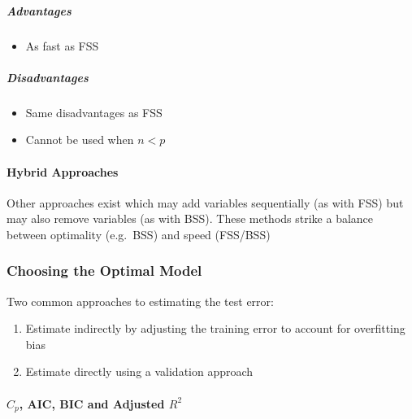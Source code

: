\documentclass[11pt]{article}
\providecommand{\tightlist}{%
      \setlength{\itemsep}{0pt}\setlength{\parskip}{0pt}}
\begin{document}
    \hypertarget{advantages}{%
\subparagraph{Advantages}\label{advantages}}

    \begin{itemize}
\tightlist
\item
  As fast as FSS
\end{itemize}

    \hypertarget{disadvantages}{%
\subparagraph{Disadvantages}\label{disadvantages}}

    \begin{itemize}
\tightlist
\item
  Same disadvantages as FSS
\item
  Cannot be used when \(n < p\)
\end{itemize}

    \hypertarget{hybrid-approaches}{%
\paragraph{Hybrid Approaches}\label{hybrid-approaches}}

    Other approaches exist which may add variables sequentially (as with
FSS) but may also remove variables (as with BSS). These methods strike a
balance between optimality (e.g.~BSS) and speed (FSS/BSS)

    \hypertarget{choosing-the-optimal-model}{%
\subsubsection{Choosing the Optimal
Model}\label{choosing-the-optimal-model}}

    Two common approaches to estimating the test error:

\begin{enumerate}
\def\labelenumi{\arabic{enumi}.}
\tightlist
\item
  Estimate indirectly by adjusting the training error to account for
  overfitting bias
\item
  Estimate directly using a validation approach
\end{enumerate}

    \hypertarget{c_p-aic-bic-and-adjusted-r2}{%
\paragraph{\texorpdfstring{\(C_p\), AIC, BIC and Adjusted
\(R^2\)}{C\_p, AIC, BIC and Adjusted R\^{}2}}\label{c_p-aic-bic-and-adjusted-r2}}
\end{document}
